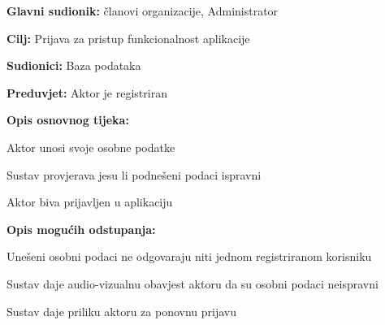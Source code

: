 					
					\noindent {}
					\begin{packed_item}
						
						\item \textbf{Glavni sudionik: }članovi organizacije, Administrator
						\item  \textbf{Cilj:} Prijava za pristup funkcionalnost aplikacije
						\item  \textbf{Sudionici:} Baza podataka
						\item  \textbf{Preduvjet:} Aktor je registriran
						\item  \textbf{Opis osnovnog tijeka:}
						
						\item[] \begin{packed_enum}
							
							\item Aktor unosi svoje osobne podatke
							\item Sustav provjerava jesu li podnešeni podaci ispravni
							\item Aktor biva prijavljen u aplikaciju
						\end{packed_enum}
						
						\item  \textbf{Opis mogućih odstupanja:}
						
						\item[] \begin{packed_item}
							
							\item[2.a] Unešeni osobni podaci ne odgovaraju niti jednom registriranom korisniku
							\item[] \begin{packed_enum}
								
								\item Sustav daje audio-vizualnu obavjest aktoru da su osobni podaci neispravni
								\item Sustav daje priliku aktoru za ponovnu prijavu
								
							\end{packed_enum}
							
						\end{packed_item}
					\end{packed_item}
				
